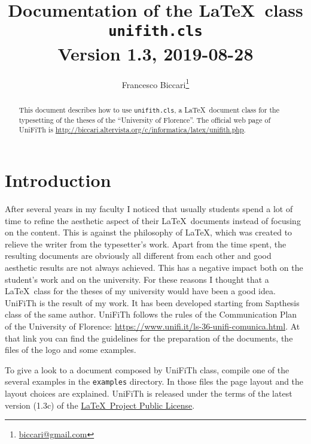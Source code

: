 \documentclass[a5paper,11pt]{article}
\author{\small Francesco Biccari\thanks{\href{mailto:biccari@gmail.com}{biccari@gmail.com}}}
\title{\small Documentation of the \LaTeX\ class\\
		\Large \textbf{\texttt{unifith.cls}}\\
		\small \vspace{0.2cm} Version 1.3, 2019-08-28
}
\date{}
\begin{document}
\maketitle

\begin{abstract}\noindent
This document describes how to use \texttt{unifith.cls}, a \LaTeX\ document class for the typesetting of the theses of the ``University of Florence''. The official web page of \textsf{UniFiTh} is {\footnotesize\url{http://biccari.altervista.org/c/informatica/latex/unifith.php}}.
\end{abstract}

\setcounter{tocdepth}{2}
\renewcommand{\columnseprule}{0.4pt}
\setlength{\columnsep}{1.5cm}

{\small
\tableofcontents}

\clearpage

\section{Introduction}

After several years in my faculty I noticed that usually students spend a lot of time to refine the aesthetic aspect of their \LaTeX\ documents instead of focusing on the content.
This is against the philosophy of \LaTeX, which was created to relieve the writer from the typesetter's work.
Apart from the time spent, the resulting documents are obviously all different from each other and good aesthetic results are not always achieved.
This has a negative impact both on the student's work and on the university.
For these reasons I thought that a \LaTeX\ class for the theses of my 
university would have been a good idea.
\textsf{UniFiTh} is the result of my work.
It has been developed starting from \textsf{Sapthesis} class of the same author. \textsf{UniFiTh} follows the rules of the Communication Plan of the University of Florence: {\footnotesize\url{https://www.unifi.it/ls-36-unifi-comunica.html}}. At that link you can find the guidelines for the preparation of the documents, the files of the logo and some examples. 

To give a look to a document composed by \textsf{UniFiTh} class, compile one of the several examples in the \texttt{examples} directory.
In those files the page layout and the layout choices are explained.
\textsf{UniFiTh} is released under the terms of the latest version (1.3c) of the 
\href{http://www.latex-project.org/lppl/}{\LaTeX\ Project Public License}.
\end{document}
